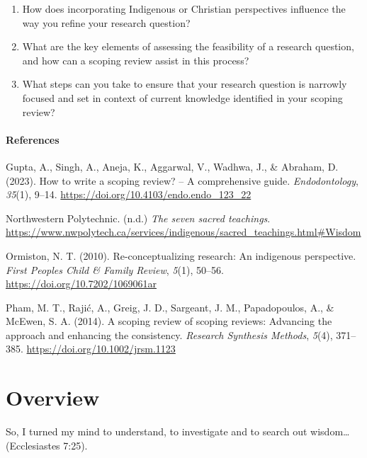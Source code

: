 \documentclass[
  letterpaper,
  DIV=11,
  numbers=noendperiod]{scrreprt}
\providecommand{\tightlist}{%
  \setlength{\itemsep}{0pt}\setlength{\parskip}{0pt}}\usepackage{longtable,booktabs,array}
\begin{document}
\begin{enumerate}
\def\labelenumi{\arabic{enumi}.}
\tightlist
\item
  How does incorporating Indigenous or Christian perspectives influence
  the way you refine your research question?
\item
  What are the key elements of assessing the feasibility of a research
  question, and how can a scoping review assist in this process?
\item
  What steps can you take to ensure that your research question is
  narrowly focused and set in context of current knowledge identified in
  your scoping review?
\end{enumerate}

\subsubsection*{References}\label{references-4}

Gupta, A., Singh, A., Aneja, K., Aggarwal, V., Wadhwa, J., \& Abraham,
D. (2023). How to write a scoping review? -- A comprehensive guide.
\emph{Endodontology}, \emph{35}(1), 9--14.
\url{https://doi.org/10.4103/endo.endo_123_22}

Northwestern Polytechnic. (n.d.) \emph{The seven sacred teachings}.
\url{https://www.nwpolytech.ca/services/indigenous/sacred_teachings.html\#Wisdom}

Ormiston, N. T. (2010). Re-conceptualizing research: An indigenous
perspective. \emph{First Peoples Child \& Family Review}, \emph{5}(1),
50--56. \url{https://doi.org/10.7202/1069061ar}

Pham, M. T., Rajić, A., Greig, J. D., Sargeant, J. M., Papadopoulos, A.,
\& McEwen, S. A. (2014). A scoping review of scoping reviews: Advancing
the approach and enhancing the consistency. \emph{Research Synthesis
Methods}, \emph{5}(4), 371--385. \url{https://doi.org/10.1002/jrsm.1123}


\chapter*{Overview}\label{overview-5}


So, I turned my mind to understand, to investigate and to search out
wisdom\ldots{} (Ecclesiastes 7:25).
\end{document}
